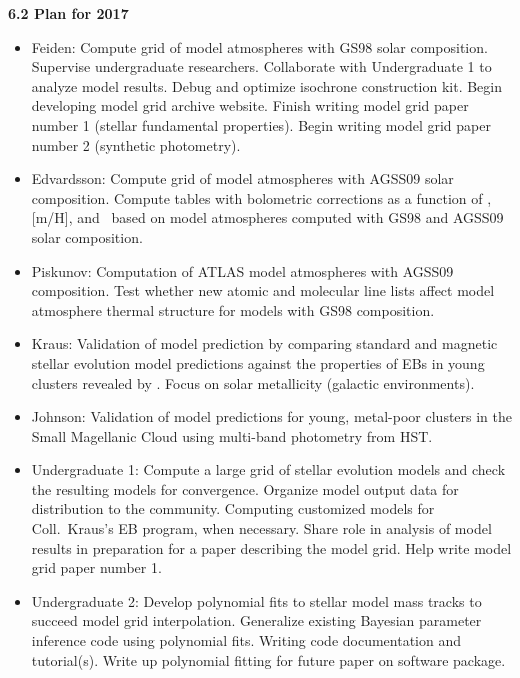 {\bf 6.2 Plan for 2017}

\begin{itemize}
	\item[] Feiden: Compute grid of model atmospheres with GS98 solar composition. Supervise undergraduate researchers. Collaborate with Undergraduate 1 to analyze model results. Debug and optimize isochrone construction kit. Begin developing model grid archive website. Finish writing model grid paper number 1 (stellar fundamental properties). Begin writing model grid paper number 2 (synthetic photometry). \\
	
	\item[] Edvardsson: Compute grid of model atmospheres with AGSS09 solar composition. Compute tables with bolometric corrections as a function of \logg, [m/H], and \teff\ based on model atmospheres computed with GS98 and AGSS09 solar composition. \\
	
	\item[] Piskunov: Computation of ATLAS model atmospheres with AGSS09 composition. Test whether new atomic and molecular line lists affect model atmosphere thermal structure for models with GS98 composition. \\
	
	\item[] Kraus: Validation of model prediction by comparing standard and magnetic stellar evolution model predictions against the properties of EBs in young clusters revealed by \kepler. Focus on solar metallicity (galactic environments). \\
	
	\item[] Johnson: Validation of model predictions for young, metal-poor clusters in the Small Magellanic Cloud using multi-band photometry from HST. \\
	
	\item[] Undergraduate 1: Compute a large grid of stellar evolution models and check the resulting models for convergence. Organize model output data for distribution to the community. Computing customized models for Coll.\ Kraus's EB program, when necessary. Share role in analysis of model results in preparation for a paper describing the model grid. Help write model grid paper number 1. \\
	
	\item[] Undergraduate 2: Develop polynomial fits to stellar model mass tracks to succeed model grid interpolation. Generalize existing Bayesian parameter inference code using polynomial fits. Writing code documentation and tutorial(s). Write up polynomial fitting for future paper on software package. \\
\end{itemize} 

